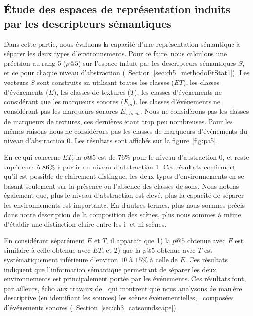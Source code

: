 \subsection{Étude des espaces de représentation induits par les descripteurs sémantiques}

Dans cette partie, nous évaluons la capacité d'une représentation sémantique à séparer les deux types d'environnements. Pour ce faire, nous calculons une précision au rang 5 ($p@5$) sur l'espace induit par les descripteurs sémantiques $S$, et ce pour chaque niveau d'abstraction (\cf~Section~\ref{sec:ch5_methodoEtStat1}). Les vecteurs $S$ sont construits en utilisant toutes les classes ($ET$), les classes d'événements ($E$), les classes de textures ($T$), les classes d'événements ne considérant que les marqueurs sonores ($E_m$), les classes d'événements ne considérant pas les marqueurs sonores $E_{w/o,m}$. Nous ne considérons pas les classes de marqueurs de textures, ces dernières étant trop peu nombreuses. Pour les mêmes raisons nous ne considérons pas les classes de marqueurs d'événements du niveau d'abstraction 0. Les résultats sont affichés sur la figure~\ref{fig:pa5}.

En ce qui concerne $ET$, la $p@5$ est de $76\%$ pour le niveau d'abstraction 0, et reste supérieure à $86\%$ à partir du niveau d'abstraction 1. Ces résultats confirment qu'il est possible de clairement distinguer les deux types d'environnements en se basant seulement sur la présence ou l'absence des classes de sons. Nous notons également que, plus le niveau d'abstraction est élevé, plus la capacité de séparer les environnements est importante. En d'autres termes, plus nous sommes précis dans notre description de la composition des scènes, plus nous sommes à même d'établir une distinction claire entre les i- et ni-scènes.

En considérant séparément $E$ et $T$, il apparaît que 1) la $p@5$ obtenue avec $E$ est similaire à celle obtenue avec $ET$, et 2) que la $p@5$ obtenue avec $T$ est systématiquement inférieure d'environ $10$ à $15\%$ à celle de $E$. Ces résultats indiquent que l'information sémantique permettant de séparer les deux environnements est principalement portée par les événements. Ces résultats font, par ailleurs, écho aux travaux de  \citep{maffiolo_caracterisation_1999}, qui montrent que nous analysons de manière descriptive (en identifiant les sources) les scènes événementielles, \ie~composées d'événements sonores (\cf~Section~\ref{sec:ch3_catsoundscape}).

